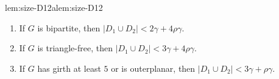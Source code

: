 \begin{adapted}{lem:size-D12}{alem:size-D12}
  \begin{enumerate}
    \item If $G$ is bipartite, then $|D_1\cup D_2| < 2\gamma+4\rho\gamma$.\smallskip
    \item If $G$ is triangle-free, then $|D_1\cup D_2| < 3\gamma+4\rho\gamma$.\smallskip
    \item If $G$ has girth at least $5$ or is outerplanar, then $|D_1\cup D_2| < 3\gamma+\rho\gamma$.
  \end{enumerate}
\end{adapted}
